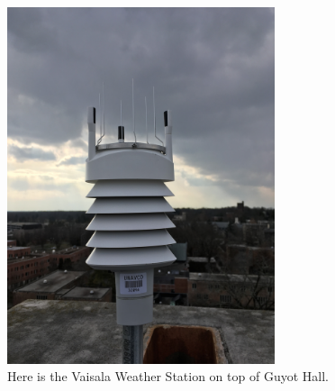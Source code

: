 \documentclass[11pt]{report}
\begin{document}
	\begin{figure}[h]
		\centering
		\includegraphics[width = 0.7\textwidth]{Figures/weather_station.jpg}
		\caption[Vaisala Weather Station]{
			Here is the Vaisala Weather Station on top of Guyot Hall.  
		}
	\end{figure}
	
\end{document}
